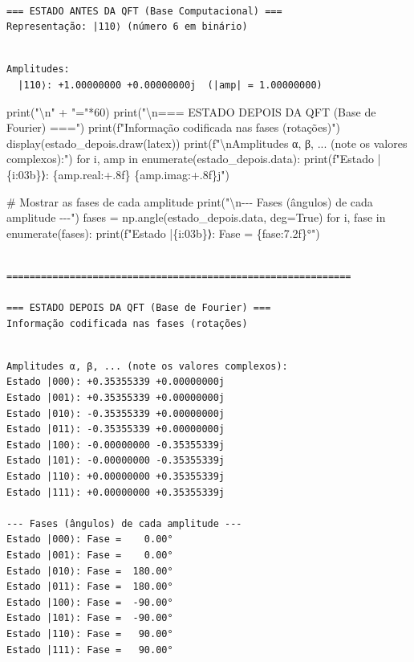 \documentclass[
  brazilian,
]{report}
\newenvironment{Shaded}{\begin{snugshade}}{\end{snugshade}}
\newcommand{\NormalTok}[1]{\textcolor[rgb]{0.00,0.23,0.31}{#1}}
\begin{document}
\begin{verbatim}

=== ESTADO ANTES DA QFT (Base Computacional) ===
Representação: |110⟩ (número 6 em binário)
\end{verbatim}

\begin{verbatim}

Amplitudes:
  |110⟩: +1.00000000 +0.00000000j  (|amp| = 1.00000000)
\end{verbatim}

\begin{Shaded}
\begin{Highlighting}[]


\NormalTok{print("\textbackslash{}n" + "="*60)}
\NormalTok{print("\textbackslash{}n=== ESTADO DEPOIS DA QFT (Base de Fourier) ===")}
\NormalTok{print(f"Informação codificada nas fases (rotações)")}
\NormalTok{display(estado\_depois.draw(\textquotesingle{}latex\textquotesingle{}))}
\NormalTok{print(f"\textbackslash{}nAmplitudes α, β, ... (note os valores complexos):")}
\NormalTok{for i, amp in enumerate(estado\_depois.data):}
\NormalTok{    print(f"Estado |\{i:03b\}⟩: \{amp.real:+.8f\} \{amp.imag:+.8f\}j")}

\NormalTok{\# Mostrar as fases de cada amplitude}
\NormalTok{print("\textbackslash{}n{-}{-}{-} Fases (ângulos) de cada amplitude {-}{-}{-}")}
\NormalTok{fases = np.angle(estado\_depois.data, deg=True)}
\NormalTok{for i, fase in enumerate(fases):}
\NormalTok{    print(f"Estado |\{i:03b\}⟩: Fase = \{fase:7.2f\}°")}
\end{Highlighting}
\end{Shaded}

\begin{verbatim}

============================================================

=== ESTADO DEPOIS DA QFT (Base de Fourier) ===
Informação codificada nas fases (rotações)
\end{verbatim}

\begin{verbatim}

Amplitudes α, β, ... (note os valores complexos):
Estado |000⟩: +0.35355339 +0.00000000j
Estado |001⟩: +0.35355339 +0.00000000j
Estado |010⟩: -0.35355339 +0.00000000j
Estado |011⟩: -0.35355339 +0.00000000j
Estado |100⟩: -0.00000000 -0.35355339j
Estado |101⟩: -0.00000000 -0.35355339j
Estado |110⟩: +0.00000000 +0.35355339j
Estado |111⟩: +0.00000000 +0.35355339j

--- Fases (ângulos) de cada amplitude ---
Estado |000⟩: Fase =    0.00°
Estado |001⟩: Fase =    0.00°
Estado |010⟩: Fase =  180.00°
Estado |011⟩: Fase =  180.00°
Estado |100⟩: Fase =  -90.00°
Estado |101⟩: Fase =  -90.00°
Estado |110⟩: Fase =   90.00°
Estado |111⟩: Fase =   90.00°
\end{verbatim}
\end{document}
